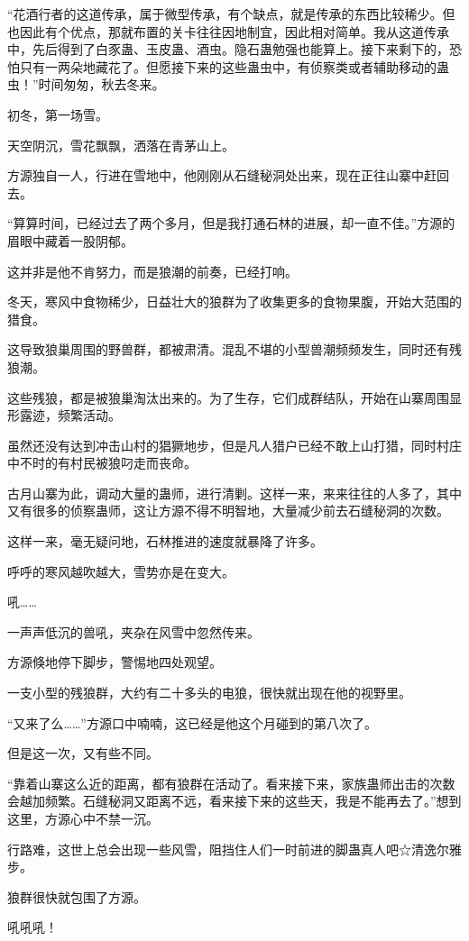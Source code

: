\begin{this_body}
“花酒行者的这道传承，属于微型传承，有个缺点，就是传承的东西比较稀少。但也因此有个优点，那就布置的关卡往往因地制宜，因此相对简单。我从这道传承中，先后得到了白豕蛊、玉皮蛊、酒虫。隐石蛊勉强也能算上。接下来剩下的，恐怕只有一两朵地藏花了。但愿接下来的这些蛊虫中，有侦察类或者辅助移动的蛊虫！”时间匆匆，秋去冬来。

初冬，第一场雪。

天空阴沉，雪花飘飘，洒落在青茅山上。

方源独自一人，行进在雪地中，他刚刚从石缝秘洞处出来，现在正往山寨中赶回去。

“算算时间，已经过去了两个多月，但是我打通石林的进展，却一直不佳。”方源的眉眼中藏着一股阴郁。

这并非是他不肯努力，而是狼潮的前奏，已经打响。

冬天，寒风中食物稀少，日益壮大的狼群为了收集更多的食物果腹，开始大范围的猎食。

这导致狼巢周围的野兽群，都被肃清。混乱不堪的小型兽潮频频发生，同时还有残狼潮。

这些残狼，都是被狼巢淘汰出来的。为了生存，它们成群结队，开始在山寨周围显形露迹，频繁活动。

虽然还没有达到冲击山村的猖獗地步，但是凡人猎户已经不敢上山打猎，同时村庄中不时的有村民被狼叼走而丧命。

古月山寨为此，调动大量的蛊师，进行清剿。这样一来，来来往往的人多了，其中又有很多的侦察蛊师，这让方源不得不明智地，大量减少前去石缝秘洞的次数。

这样一来，毫无疑问地，石林推进的速度就暴降了许多。

呼呼的寒风越吹越大，雪势亦是在变大。

吼……

一声声低沉的兽吼，夹杂在风雪中忽然传来。

方源倏地停下脚步，警惕地四处观望。

一支小型的残狼群，大约有二十多头的电狼，很快就出现在他的视野里。

“又来了么……”方源口中喃喃，这已经是他这个月碰到的第八次了。

但是这一次，又有些不同。

“靠着山寨这么近的距离，都有狼群在活动了。看来接下来，家族蛊师出击的次数会越加频繁。石缝秘洞又距离不远，看来接下来的这些天，我是不能再去了。”想到这里，方源心中不禁一沉。

行路难，这世上总会出现一些风雪，阻挡住人们一时前进的脚蛊真人吧☆清逸尔雅步。

狼群很快就包围了方源。

吼吼吼！


\end{this_body}
